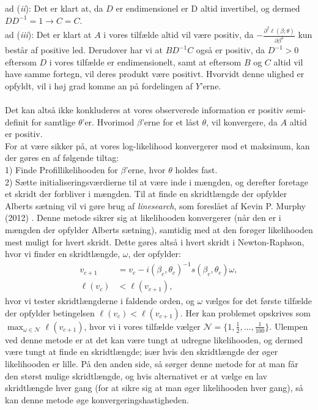 \documentclass[11pt,a4paper]{article}
\begin{document}
ad (\textit{ii}): Det er klart at, da $D$ er endimensionel er D altid invertibel, og dermed $D D^{-1}=1 \rightarrow C=C$.\\
ad (\textit{iii}):
Det er klart at $A$ i vores tilfælde altid vil være positiv, da $-\frac{\partial^2 \ell(\beta;\theta)}{\partial \beta^2}$ kun består af positive led.
Derudover har vi at $BD^{-1}C$ også er positiv, da $D^{-1}>0$ eftersom $D$ i vores tilfælde er endimensionelt, samt at eftersom $B$ og $C$ altid vil have samme fortegn, vil deres produkt være positivt. Hvorvidt denne ulighed er opfyldt, vil 
i høj grad komme an på fordelingen af $Y$'erne. \\\\
Det kan altså ikke konkluderes at vores observerede information er positiv semi-definit for samtlige $\theta$'er. Hvorimod $\beta$'erne for et låst $\theta$, vil konvergere, da $A$ altid er positiv. \\
For at være sikker på, at vores log-likelihood konvergerer mod et maksimum, kan der gøres en af følgende tiltag:\\
1) Finde Profillikelihooden for $\beta$'erne, hvor $\theta$ holdes fast.\\
2) Sætte initialiseringsværdierne til at være inde i mængden, og derefter foretage et skridt der forbliver i mængden. Til at finde en skridtlængde der opfylder Alberts sætning vil vi gøre brug af \textit{linesearch}, som foreslået af Kevin P. Murphy (2012) \cite{LineSearch}. Denne metode sikrer sig at likelihooden konvergerer (når den er i mængden der opfylder Alberts sætning), samtidig med at den forøger likelihooden mest muligt for hvert skridt. Dette gøres altså i hvert skridt i Newton-Raphson, hvor vi finder en skridtlængde, $\omega$, der opfylder:\\
\begin{align*}
    v_{c+1} &= v_{c} -  i(\beta_c,\theta_c)^{-1}s(\beta_c,\theta_c)\omega,\\
    \ell(v_{c}) &< \ell(v_{c+1}),
\end{align*}
hvor vi tester skridtlængderne i faldende orden, og $\omega$ vælges for det første tilfælde der opfylder betingelsen $\ell(v_c)<\ell(v_{c+1})$. 
Her kan problemet opskrives som 
$\max_{\omega \in \mathcal{N}} \ell(v_{c+1})$, hvor vi i vores tilfælde vælger 
$\mathcal{N} = \{1,\frac{1}{2},...,\frac{1}{100}\}$. Ulempen ved denne metode er at det kan være tungt at udregne likelihooden, og dermed være tungt at finde en skridtlængde; især hvis den skridtlængde der øger likelihooden er lille. På den anden side, så sørger denne metode for at man får den størst mulige skridtlængde, og hvis alternativet er at vælge en lav skridtlængde hver gang (for at sikre sig at man øger likelihooden hver gang), så kan denne metode øge konvergeringshastigheden.\\
\end{document}
